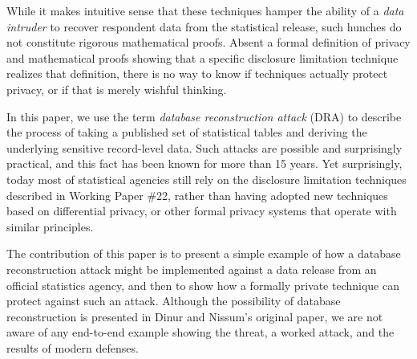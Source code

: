 While it makes intuitive sense that these techniques hamper the
ability of a  \emph{data intruder} to recover respondent data from the
statistical release, such hunches do not constitute rigorous
mathematical proofs. Absent a formal definition of privacy and
mathematical proofs showing that a specific disclosure limitation
technique realizes that definition, there is no way to know if
techniques actually protect privacy, or if that is merely wishful thinking.

In this paper, we use
the term \emph{database reconstruction attack} (DRA) to describe the process of
taking a published set of statistical tables and deriving the
underlying sensitive record-level data. Such attacks are possible and surprisingly
practical, and this fact has been known for more than 15
years\cite{noise}. Yet surprisingly, today most of
statistical agencies still rely on the disclosure
limitation techniques described in Working Paper \#22, rather than
having adopted new techniques based on differential
privacy\cite{Dwork:2006:CNS:2180286.2180305}, or other formal privacy systems 
that operate with similar principles\cite{KiferMachanavajjhala:2012}.

The contribution of this paper is to present a simple example of how
a database reconstruction attack might be implemented against a data
release from an official statistics agency, and then to show how a
formally private technique can protect against such an
attack. Although the possibility of database reconstruction is
presented in Dinur and Nissum's original paper\cite{noise}, we are not
aware of any \iflongversion end-to-end \fi example showing the threat, a worked attack,
and the results of modern defenses.




